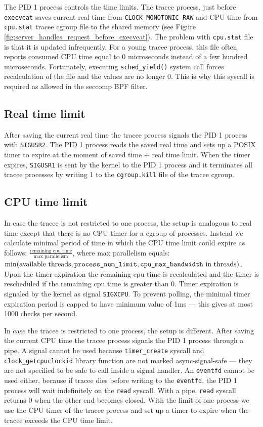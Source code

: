 \documentclass[en]{pracamgr}
\begin{document}
The PID 1 process controls the time limits. The tracee process, just before \texttt{execveat} saves current real time from \texttt{CLOCK\_MONOTONIC\_RAW} and CPU time from \texttt{cpu.stat} tracee cgroup file to the shared memory (see Figure \ref{fig:server_handles_request_before_execveat}). The problem with \texttt{cpu.stat} file is that it is updated infrequently. For a young tracee process, this file often reports consumed CPU time equal to 0 microseconds instead of a few hundred microseconds. Fortunately, executing \texttt{sched\_yield()} system call forces recalculation of the file and the values are no longer 0. This is why this syscall is required as allowed in the seccomp BPF filter.

\subsection{Real time limit}

After saving the current real time the tracee process signals the PID 1 process with \texttt{SIGUSR2}. The PID 1 process reads the saved real time and sets up a POSIX timer to expire at the moment of saved time + real time limit. When the timer expires, \texttt{SIGUSR1} is sent by the kernel to the PID 1 process and it terminates all tracee processes by writing 1 to the \texttt{cgroup.kill} file of the tracee cgroup.

\subsection{CPU time limit}

In case the tracee is not restricted to one process, the setup is analogous to real time except that there is no CPU timer for a cgroup of processes. Instead we calculate minimal period of time in which the CPU time limit could expire as follows: $\frac{\text{remaining cpu time}}{\text{max parallelism}}$, where max parallelism equals: $\min(\text{available threads}, \text{\texttt{process\_num\_limit}}, \text{\texttt{cpu\_max\_bandwidth} in threads})$. Upon the timer expiration the remaining cpu time is recalculated and the timer is rescheduled if the remaining cpu time is greater than 0. Timer expiration is signaled by the kernel as signal \texttt{SIGXCPU}. To prevent polling, the minimal timer expiration period is capped to have minimum value of 1ms --- this gives at most 1000 checks per second.

In case the tracee is restricted to one process, the setup is different. After saving the current CPU time the tracee process signals the PID 1 process through a pipe. A signal cannot be used because \texttt{timer\_create} syscall and \texttt{clock\_getcpuclockid} library function are not marked async-signal-safe --- they are not specified to be safe to call inside a signal handler. An \texttt{eventfd} cannot be used either, because if tracee dies before writing to the \texttt{eventfd}, the PID 1 process will wait indefinitely on the \texttt{read} syscall. With a pipe, \texttt{read} syscall returns 0 when the other end becomes closed. With the limit of one process we use the CPU timer of the tracee process and set up a timer to expire when the tracee exceeds the CPU time limit.
\end{document}

